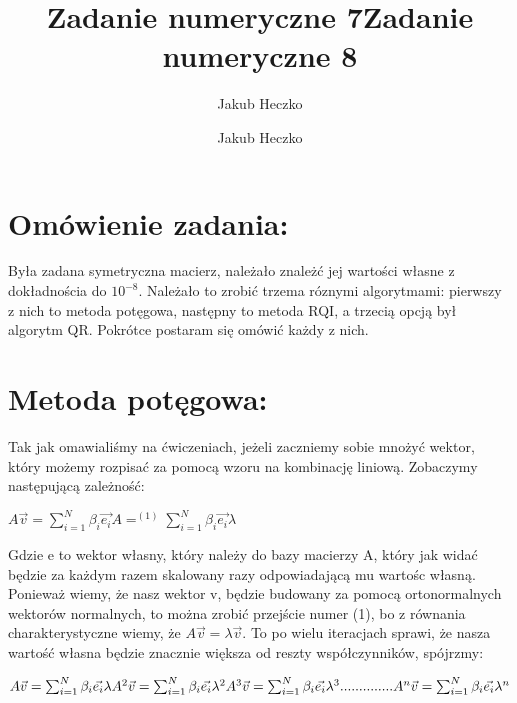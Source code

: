 \documentclass[12pt]{article}
\title{{\Large}Zadanie numeryczne 7}
\date{}
\author{Jakub Heczko}
\begin{document}
\title{{\Large}Zadanie numeryczne 8}
\date{}
\author{Jakub Heczko}

\maketitle

\section{Omówienie zadania:}
Była zadana symetryczna macierz, należało znależć jej wartości własne z dokładnościa do ${10^{-8}}$. Należało to zrobić trzema róznymi algorytmami: pierwszy z nich to metoda potęgowa, następny to metoda RQI, a trzecią opcją był algorytm QR. Pokrótce postaram się omówić każdy z nich.
\section{Metoda potęgowa:}
Tak jak omawialiśmy na ćwiczeniach, jeżeli zaczniemy sobie mnożyć wektor, który możemy rozpisać za pomocą wzoru na kombinację liniową. Zobaczymy następującą zależność:
\begin{center}
\begin{math}
    A\vec{v} = \sum_{i=1}^{N}\beta_{i}\vec{e_{i}}A =^{(1)} \sum_{i=1}^{N}\beta_{i}\vec{e_{i}}\lambda
\end{math}
\end{center}
Gdzie e to wektor własny, który należy do bazy macierzy A, który jak widać będzie za każdym razem skalowany razy odpowiadającą mu wartośc własną. Ponieważ wiemy, że nasz wektor v, będzie budowany za pomocą ortonormalnych wektorów normalnych, to można zrobić przejście numer (1), bo z równania charakterystyczne wiemy, że $A\vec{v} =\lambda \vec{v}$. To po wielu iteracjach sprawi, że nasza wartość własna będzie znacznie większa od reszty współczynników, spójrzmy:
\begin{center}
    \begin{math}
        A\vec{v} = \sum_{i=1}^{N}\beta_{i}\vec{e_{i}}\lambda \newline
        A^{2}\vec{v} = \sum_{i=1}^{N}\beta_{i}\vec{e_{i}}\lambda^{2} \newline
        A^{3}\vec{v} = \sum_{i=1}^{N}\beta_{i}\vec{e_{i}}\lambda^{3} \newline
        ..............\newline
        A^{n}\vec{v} = \sum_{i=1}^{N}\beta_{i}\vec{e_{i}}\lambda^{n} \newline
    \end{math}
\end{center}
\end{document}
